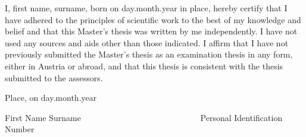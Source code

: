\noindent
I, first name, surname, born on day.month.year in place, hereby certify that I have adhered to the principles of scientific work to the best of my knowledge and belief and that this Master’s thesis was written by me independently. I have not used any sources and aids other than those indicated. I affirm that I have not previously submitted the Master’s thesis as an examination thesis in any form, either in Austria or abroad, and that this thesis is consistent with the thesis submitted to the assessors.

\par
\vspace{10mm}
\noindent
Place, on day.month.year

\par
\vspace{20mm}
\noindent
First Name Surname ~~~~~~~~~~~~~~~~~~~~~~~~~~~~Personal Identification Number %